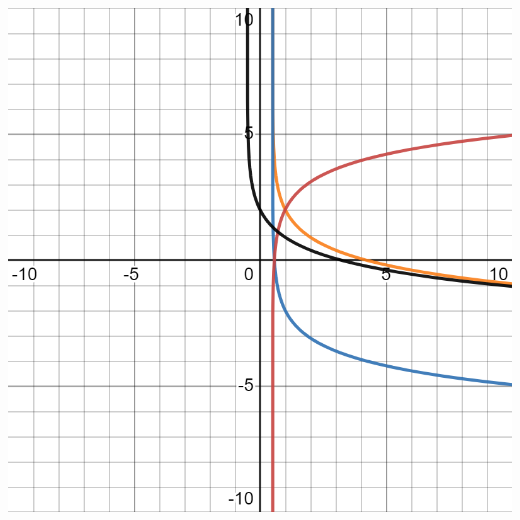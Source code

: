 \documentclass{ximera}
\begin{document}
\begin{exercise}
\begin{exercise}
\begin{exercise}
\begin{exercise}
\includegraphics[width=1\linewidth]{FT20graph.png}

\begin{multipleChoice}
\end{multipleChoice}

\end{exercise}
\end{exercise}
\end{exercise}
\end{exercise}
\end{document}
